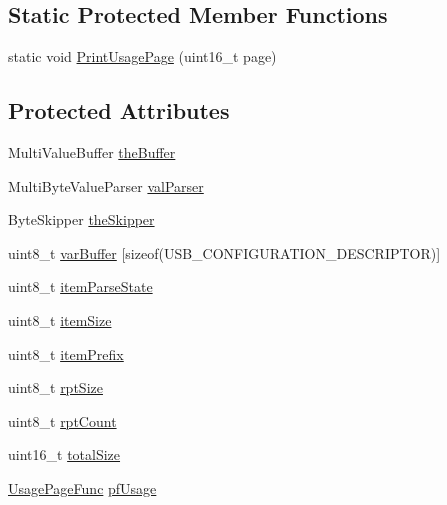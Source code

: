 \subsection*{\-Static \-Protected \-Member \-Functions}
\begin{DoxyCompactItemize}
\item 
static void \hyperlink{class_report_desc_parser_base_a789ad1fbd8437296627412a2b4a255a3}{\-Print\-Usage\-Page} (uint16\-\_\-t page)
\end{DoxyCompactItemize}
\subsection*{\-Protected \-Attributes}
\begin{DoxyCompactItemize}
\item 
\-Multi\-Value\-Buffer \hyperlink{class_report_desc_parser_base_a5ac0dd6f06df15a4cd2bad3fa175e7b9}{the\-Buffer}
\item 
\-Multi\-Byte\-Value\-Parser \hyperlink{class_report_desc_parser_base_a8833e671168779d081e7f50e579bc206}{val\-Parser}
\item 
\-Byte\-Skipper \hyperlink{class_report_desc_parser_base_a23b769d890d9f578fd6b8f47cb1f7e23}{the\-Skipper}
\item 
uint8\-\_\-t \hyperlink{class_report_desc_parser_base_a82cde32720eba596e5864fe7d541ea13}{var\-Buffer} \mbox{[}sizeof(\-U\-S\-B\-\_\-\-C\-O\-N\-F\-I\-G\-U\-R\-A\-T\-I\-O\-N\-\_\-\-D\-E\-S\-C\-R\-I\-P\-T\-O\-R)\mbox{]}
\item 
uint8\-\_\-t \hyperlink{class_report_desc_parser_base_adfc790524e25a7ad715b1e9adff54a25}{item\-Parse\-State}
\item 
uint8\-\_\-t \hyperlink{class_report_desc_parser_base_a4f0da61c408fc42e373b6cc03cd97fab}{item\-Size}
\item 
uint8\-\_\-t \hyperlink{class_report_desc_parser_base_a70693c641100c952022ec5c160de1a8d}{item\-Prefix}
\item 
uint8\-\_\-t \hyperlink{class_report_desc_parser_base_a222b1c03a4f3e49283a58ecaa853e247}{rpt\-Size}
\item 
uint8\-\_\-t \hyperlink{class_report_desc_parser_base_a2c15a93cace44e39560e4613bbefaf14}{rpt\-Count}
\item 
uint16\-\_\-t \hyperlink{class_report_desc_parser_base_aa5223ad6eb8be8c7fb53a98d4ddde594}{total\-Size}
\item 
\hyperlink{class_report_desc_parser_base_aeb139df01922910be7558b3c3a893db2}{\-Usage\-Page\-Func} \hyperlink{class_report_desc_parser_base_a22006cbf92a3d4008695e53d7f6e2452}{pf\-Usage}
\end{DoxyCompactItemize}
